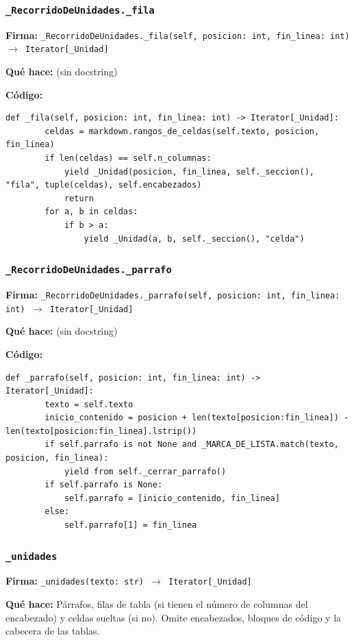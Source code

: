 \documentclass[11pt,a4paper]{article}
\begin{document}
\subsubsection*{\texttt{\_RecorridoDeUnidades.\_fila}}
\textbf{Firma:} \texttt{\_RecorridoDeUnidades.\_fila(self, posicion: int, fin\_linea: int) $\rightarrow$ Iterator[\_Unidad]}

\textbf{Qué hace:} (sin docstring)

\textbf{Código:}
\begin{lstlisting}
def _fila(self, posicion: int, fin_linea: int) -> Iterator[_Unidad]:
        celdas = markdown.rangos_de_celdas(self.texto, posicion, fin_linea)
        if len(celdas) == self.n_columnas:
            yield _Unidad(posicion, fin_linea, self._seccion(), "fila", tuple(celdas), self.encabezados)
            return
        for a, b in celdas:
            if b > a:
                yield _Unidad(a, b, self._seccion(), "celda")
\end{lstlisting}

\subsubsection*{\texttt{\_RecorridoDeUnidades.\_parrafo}}
\textbf{Firma:} \texttt{\_RecorridoDeUnidades.\_parrafo(self, posicion: int, fin\_linea: int) $\rightarrow$ Iterator[\_Unidad]}

\textbf{Qué hace:} (sin docstring)

\textbf{Código:}
\begin{lstlisting}
def _parrafo(self, posicion: int, fin_linea: int) -> Iterator[_Unidad]:
        texto = self.texto
        inicio_contenido = posicion + len(texto[posicion:fin_linea]) - len(texto[posicion:fin_linea].lstrip())
        if self.parrafo is not None and _MARCA_DE_LISTA.match(texto, posicion, fin_linea):
            yield from self._cerrar_parrafo()
        if self.parrafo is None:
            self.parrafo = [inicio_contenido, fin_linea]
        else:
            self.parrafo[1] = fin_linea
\end{lstlisting}

\subsubsection*{\texttt{\_unidades}}
\textbf{Firma:} \texttt{\_unidades(texto: str) $\rightarrow$ Iterator[\_Unidad]}

\textbf{Qué hace:} Párrafos, filas de tabla (si tienen el número de columnas del encabezado) y
celdas sueltas (si no). Omite encabezados, bloques de código y la cabecera de
las tablas.
\end{document}
